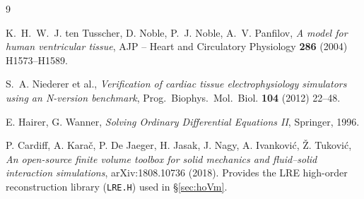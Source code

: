\documentclass[11pt,a4paper]{article}
\newcommand{\code}[1]{\texttt{\small #1}}
\begin{document}
\begin{thebibliography}{9}

 K.~H.~W.~J. ten Tusscher, D. Noble, P.~J. Noble, A.~V.
    Panfilov, \emph{A model for human ventricular tissue},
    AJP -- Heart and Circulatory Physiology
    \textbf{286} (2004) H1573--H1589.

 S.~A. Niederer et al.,
    \emph{Verification of cardiac tissue electrophysiology simulators
    using an N-version benchmark}, Prog.\ Biophys.\ Mol.\ Biol.
    \textbf{104} (2012) 22--48.

 E. Hairer, G. Wanner,
    \emph{Solving Ordinary Differential Equations II}, Springer, 1996.

 P. Cardiff, A. Karač, P. De Jaeger,
    H. Jasak, J. Nagy, A. Ivanković, Ž. Tuković,
    \emph{An open-source finite volume toolbox for solid mechanics
    and fluid--solid interaction simulations},
    arXiv:1808.10736 (2018). Provides the LRE high-order reconstruction
    library (\code{LRE.H}) used in \S\ref{sec:hoVm}.

\end{thebibliography}
\end{document}
